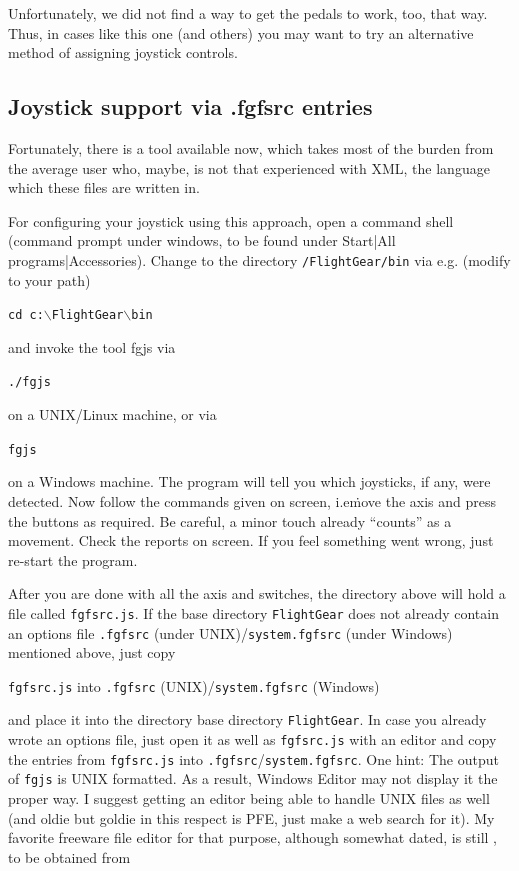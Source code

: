Unfortunately, we did not find a way to get the pedals to work, too, that way. Thus, in cases like this one (and others) you may want to try an alternative method of assigning joystick controls.


\subsection{Joystick support via .fgfsrc entries\label{fgfsrcjoy}}
Fortunately, there is a tool available now, which takes most of the burden from the average user who, maybe, is not that experienced with XML, the language which these files are written in.

For configuring your joystick using this approach, open a command shell (command prompt under windows, to be found under Start|All programs|Accessories). Change to the directory \texttt{/FlightGear/bin} via e.g. (modify to your path) 

\noindent
\texttt{cd c:$\backslash$FlightGear$\backslash$bin}

and invoke the tool fgjs via

\noindent
\texttt{./fgjs}

on a UNIX/Linux machine, or via

\noindent
\texttt{fgjs}

on a Windows machine. The program will tell you which joysticks, if any, were detected. Now follow the commands given on screen, i.e\. move the axis and press the buttons as required. Be careful, a minor touch already ``counts'' as a movement. Check the reports on screen. If you feel something went wrong, just re-start the program.

After you are done with all the axis and switches, the directory above will hold a file called \texttt{fgfsrc.js}. If the \FlightGear{} base directory \texttt{FlightGear} does not already contain an options file \texttt{.fgfsrc} (under UNIX)/\texttt{system.fgfsrc} (under Windows) mentioned above, just copy
\medskip

\noindent
 \texttt{fgfsrc.js} into \texttt{.fgfsrc} (UNIX)/\texttt{system.fgfsrc} (Windows) 
 \medskip

\noindent 
and place it into the directory \FlightGear{} base directory \texttt{FlightGear}. In case you already wrote an options file, just open it as well as \texttt{fgfsrc.js} with an editor and copy the entries from \texttt{fgfsrc.js} into \texttt{.fgfsrc}/\texttt{system.fgfsrc}. One hint: The output of \texttt{fgjs} is UNIX formatted. As a result, Windows Editor may not display it the proper way. I suggest getting an editor being able to handle UNIX files as well (and oldie but goldie in this respect is PFE, just make a web search for it). My favorite freeware file editor for that purpose, although somewhat dated, is still , to be obtained from

